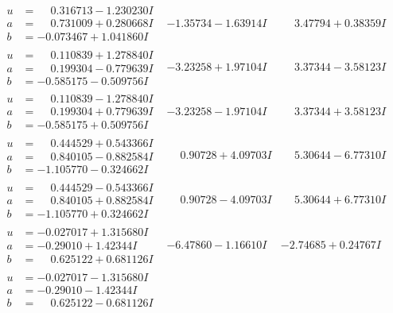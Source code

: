 \documentclass[1p]{elsarticle_modified}
\theoremstyle{definition}
\begin{document}
$$\begin{array}{c|c|c}
\begin{aligned}
u &= \phantom{-}0.316713 - 1.230230 I \\
a &= \phantom{-}0.731009 + 0.280668 I \\
b &= -0.073467 + 1.041860 I\end{aligned}
 & -1.35734 - 1.63914 I & \phantom{-}3.47794 + 0.38359 I \\ \hline\begin{aligned}
u &= \phantom{-}0.110839 + 1.278840 I \\
a &= \phantom{-}0.199304 - 0.779639 I \\
b &= -0.585175 - 0.509756 I\end{aligned}
 & -3.23258 + 1.97104 I & \phantom{-}3.37344 - 3.58123 I \\ \hline\begin{aligned}
u &= \phantom{-}0.110839 - 1.278840 I \\
a &= \phantom{-}0.199304 + 0.779639 I \\
b &= -0.585175 + 0.509756 I\end{aligned}
 & -3.23258 - 1.97104 I & \phantom{-}3.37344 + 3.58123 I \\ \hline\begin{aligned}
u &= \phantom{-}0.444529 + 0.543366 I \\
a &= \phantom{-}0.840105 - 0.882584 I \\
b &= -1.105770 - 0.324662 I\end{aligned}
 & \phantom{-}0.90728 + 4.09703 I & \phantom{-}5.30644 - 6.77310 I \\ \hline\begin{aligned}
u &= \phantom{-}0.444529 - 0.543366 I \\
a &= \phantom{-}0.840105 + 0.882584 I \\
b &= -1.105770 + 0.324662 I\end{aligned}
 & \phantom{-}0.90728 - 4.09703 I & \phantom{-}5.30644 + 6.77310 I \\ \hline\begin{aligned}
u &= -0.027017 + 1.315680 I \\
a &= -0.29010 + 1.42344 I \\
b &= \phantom{-}0.625122 + 0.681126 I\end{aligned}
 & -6.47860 - 1.16610 I & -2.74685 + 0.24767 I \\ \hline\begin{aligned}
u &= -0.027017 - 1.315680 I \\
a &= -0.29010 - 1.42344 I \\
b &= \phantom{-}0.625122 - 0.681126 I\end{aligned}

\end{array}$$
\end{document}
